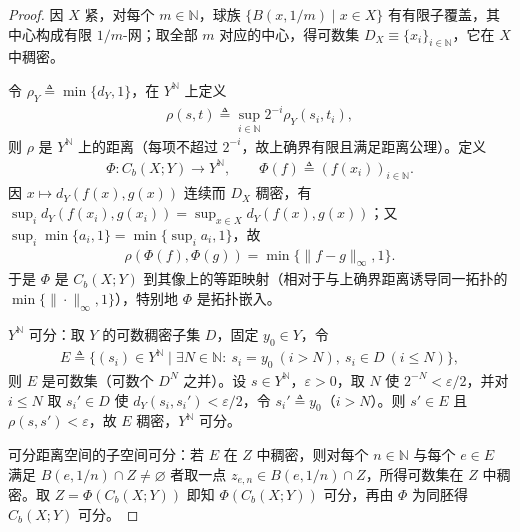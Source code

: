 \documentclass[../main.tex]{subfiles}
\begin{document}
\begin{proof}
因 $X$ 紧，对每个 $m\in\mathbb{N}$，球族 $\{B(x,1/m)\mid x\in X\}$ 有有限子覆盖，其中心构成有限 $1/m$-网；取全部 $m$ 对应的中心，得可数集 $D_X\equiv\{x_i\}_{i\in\mathbb{N}}$，它在 $X$ 中稠密。

令 $\rho_Y\triangleq\min\{d_Y,1\}$，在 $Y^{\mathbb{N}}$ 上定义
\begin{align*}
\rho(s,t)\triangleq\sup_{i\in\mathbb{N}}2^{-i}\rho_Y(s_i,t_i),
\end{align*}
则 $\rho$ 是 $Y^{\mathbb{N}}$ 上的距离（每项不超过 $2^{-i}$，故上确界有限且满足距离公理）。定义
\begin{align*}
\Phi:C_b(X;Y)\to Y^{\mathbb{N}},\qquad \Phi(f)\triangleq(f(x_i))_{i\in\mathbb{N}}.
\end{align*}
因 $x\mapsto d_Y(f(x),g(x))$ 连续而 $D_X$ 稠密，有 $\sup_{i}d_Y(f(x_i),g(x_i))=\sup_{x\in X}d_Y(f(x),g(x))$；又 $\sup_i\min\{a_i,1\}=\min\{\sup_i a_i,1\}$，故
\begin{align*}
\rho(\Phi(f),\Phi(g))=\min\bigl\{\|f-g\|_\infty,1\bigr\}.
\end{align*}
于是 $\Phi$ 是 $C_b(X;Y)$ 到其像上的等距映射（相对于与上确界距离诱导同一拓扑的 $\min\{\|\cdot\|_\infty,1\}$），特别地 $\Phi$ 是拓扑嵌入。

$Y^{\mathbb{N}}$ 可分：取 $Y$ 的可数稠密子集 $D$，固定 $y_0\in Y$，令
\begin{align*}
E\triangleq\{(s_i)\in Y^{\mathbb{N}}\mid \exists N\in\mathbb{N}:\ s_i=y_0\ (i>N),\ s_i\in D\ (i\leqslant N)\},
\end{align*}
则 $E$ 是可数集（可数个 $D^N$ 之并）。设 $s\in Y^{\mathbb{N}}$，$\varepsilon>0$，取 $N$ 使 $2^{-N}<\varepsilon/2$，并对 $i\leqslant N$ 取 $s_i'\in D$ 使 $d_Y(s_i,s_i')<\varepsilon/2$，令 $s_i'\triangleq y_0$（$i>N$）。则 $s'\in E$ 且 $\rho(s,s')<\varepsilon$，故 $E$ 稠密，$Y^{\mathbb{N}}$ 可分。

可分距离空间的子空间可分：若 $E$ 在 $Z$ 中稠密，则对每个 $n\in\mathbb{N}$ 与每个 $e\in E$ 满足 $B(e,1/n)\cap Z\neq\varnothing$ 者取一点 $z_{e,n}\in B(e,1/n)\cap Z$，所得可数集在 $Z$ 中稠密。取 $Z=\Phi(C_b(X;Y))$ 即知 $\Phi(C_b(X;Y))$ 可分，再由 $\Phi$ 为同胚得 $C_b(X;Y)$ 可分。
\end{proof}
\end{document}
